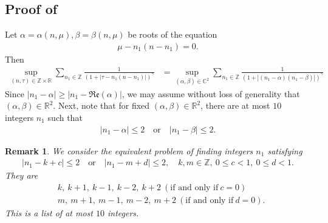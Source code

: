 \documentclass[12pt,reqno]{amsart}
\numberwithin{equation}{section}  %
\renewcommand{\cref}{\Cref}
\newcommand{\rr}{\mathbb{R}}
\newcommand{\zz}{\mathbb{Z}}
\newtheorem{remark}[theorem]{Remark}
\begin{document}
\begin{appendices}
\subsection{Proof of \cref{lem:sum-estimate}}
\label{ssec:pf-sum-est}
Let $\alpha = \alpha(n, \mu), \beta = \beta(n, \mu)$ be roots of the equation
%
%
\begin{equation*}
\begin{split}
  \mu - n_{1}(n - n_{1}) = 0.
\end{split}
\end{equation*}
%
%
Then 
%
%
\begin{equation*}
\begin{split}
\sup_{(n,\tau)\in \zz \times \rr}\sum_{n_1\in \zz}\frac{1}{(1+|\tau-
n_1(n-n_1)|)^{\gamma}}
& = \sup_{(\alpha, \beta )\in \mathbb{C}^{2}}\sum_{n_1\in \zz}\frac{1}{(1 +
|(n_{1} - \alpha)(n_{1} - \beta)|)^{\gamma}}
\end{split}
\end{equation*}
%
%
Since $| n_{1} - \alpha | \ge | n_{1} - \mathfrak{Re}(\alpha) |$, we may assume
without loss of generality that $(\alpha, \beta) \in \rr^{2}$. Next, note that
for fixed $(\alpha, \beta) \in \rr^{2}$, there are at most $10$ integers
$n_{1}$ such that
%
%
\begin{equation*}
\begin{split}
  | n_{1} - \alpha | \le 2 \quad \text{or} \quad | n_{1} - \beta | \le 2.
\end{split}
\end{equation*}
%
%
%
%
\begin{framed}
\begin{remark}
  We consider the equivalent problem of finding integers $n_{1}$ satisfying
  \begin{equation*}
\begin{split}
  | n_{1} - k +c | \le 2 \quad \text{or} \quad | n_{1} - m + d | \le 2, \quad k,
  m \in \zz, \ 0 \le c < 1, \ 0 \le d < 1.
\end{split}
\end{equation*}
They are
%
%
\begin{equation*}
\begin{split}
  &  k, \ k+1, \ k-1,
  \ k-2,  \ k+2 \ (\text{if and only if} \ c=0)
  \\
  &  m,  \ m+1, \ m-1,
  \ m-2,  \ m+2 \ (\text{if and only if} \ d=0).
\end{split}
\end{equation*}
%
%
%
%
This is a list of at most $10$ integers.
\label{rem:pf-counting}
\end{remark}

\end{framed}
\end{appendices}
\end{document}
